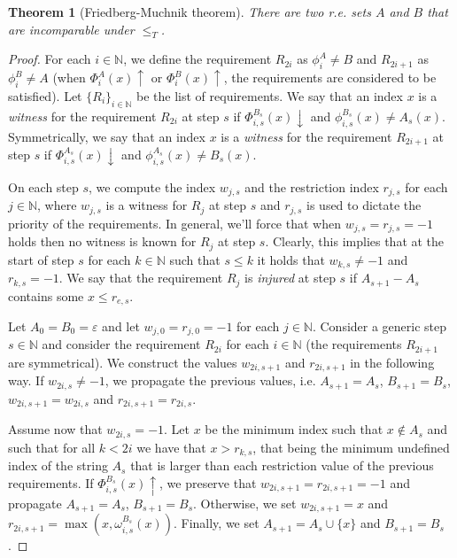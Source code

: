 \documentclass[12pt,a4paper]{article}
\newtheorem{theorem}{Theorem}
\theoremstyle{definition}
\newcommand{\N}{\mathbb{N}}                     %
\begin{document}
    \begin{theorem}[Friedberg-Muchnik theorem]
        There are two r.e. sets $A$ and $B$ that are incomparable under $\leq_T$.
    \end{theorem}

    \begin{proof}
        For each $i \in \N$, we define the requirement $R_{2i}$ as $\phi_i^A \neq B$ and $R_{2i+1}$ as $\phi_{i}^B \neq A$ (when $\Phi_i^A(x) \uparrow$ or $\Phi_i^B(x) \uparrow$, the requirements are considered to be satisfied). Let $\{R_i\}_{i \in \N}$ be the list of requirements. We say that an index $x$ is a \textit{witness} for the requirement $R_{2i}$ at step $s$ if $\Phi_{i,s}^{B_s}(x) \downarrow$ and $\phi_{i,s}^{B_s}(x) \neq A_s(x)$. Symmetrically, we say that an index $x$ is a \textit{witness} for the requirement $R_{2i+1}$ at step $s$ if $\Phi_{i,s}^{A_s}(x) \downarrow$ and $\phi_{i,s}^{A_s}(x) \neq B_s(x)$.

        On each step $s$, we compute the index $w_{j,s}$ and the restriction index $r_{j,s}$ for each $j \in \N$, where $w_{j,s}$ is a witness for $R_j$ at step $s$ and $r_{j,s}$ is used to dictate the priority of the requirements.
        In general, we'll force that when $w_{j,s} = r_{j,s} = -1$ holds then no witness is known for $R_j$ at step $s$. Clearly, this implies that at the start of step $s$ for each $k \in \N$ such that $s \leq k$ it holds that $w_{k,s} \neq -1$ and $r_{k,s} = -1$. We say that the requirement $R_j$ is \textit{injured} at step $s$ if $A_{s+1}- A_s$ contains some $x \leq r_{e,s}$.

        Let $A_0 = B_0 = \varepsilon$ and let $w_{j,0} = r_{j,0} = -1$ for each $j \in \N$. Consider a generic step $s \in \N$ and consider the requirement $R_{2i}$ for each $i \in \N$ (the requirements $R_{2i+1}$ are symmetrical). We construct the values $w_{2i,s+1}$ and $r_{2i,s+1}$ in the following way. If $w_{2i,s} \neq -1$, we propagate the previous values, i.e. $A_{s+1} = A_s$, $B_{s+1} = B_s$, $w_{2i,s+1} = w_{2i,s}$ and $r_{2i,s+1} = r_{2i,s}$.

        Assume now that $w_{2i,s} = -1$. Let $x$ be the minimum index such that $x \notin A_s$ and such that for all $k < 2i$ we have that $x > r_{k,s}$, that being the minimum undefined index of the string $A_s$ that is larger than each restriction value of the previous requirements. If $\Phi_{i,s}^{B_s}(x) \uparrow$, we preserve that $w_{2i,s+1} = r_{2i,s+1} = -1$ and propagate $A_{s+1} = A_s$, $B_{s+1} = B_s$. Otherwise, we set $w_{2i,s+1} = x$ and $r_{2i,s+1} = \max(x, \omega_{i,s}^{B_s}(x))$. Finally, we set $A_{s+1} = A_{s} \cup \{x\}$ and $B_{s+1} = B_s$.


\end{proof}
\end{document}
